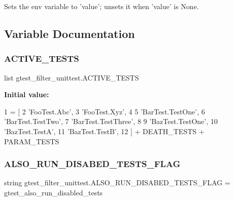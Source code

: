 \begin{DoxyVerb}Sets the env variable to 'value'; unsets it when 'value' is None.\end{DoxyVerb}
 

\subsection{Variable Documentation}
\mbox{\label{namespacegtest__filter__unittest_a8eb26cb0e0ac81737723cc9d16e1d253}} 
\subsubsection{\texorpdfstring{A\+C\+T\+I\+V\+E\+\_\+\+T\+E\+S\+TS}{ACTIVE\_TESTS}}
{\footnotesize\ttfamily list gtest\+\_\+filter\+\_\+unittest.\+A\+C\+T\+I\+V\+E\+\_\+\+T\+E\+S\+TS}

{\bfseries Initial value\+:}
\begin{DoxyCode}
1 =  [
2     \textcolor{stringliteral}{'FooTest.Abc'},
3     \textcolor{stringliteral}{'FooTest.Xyz'},
4 
5     \textcolor{stringliteral}{'BarTest.TestOne'},
6     \textcolor{stringliteral}{'BarTest.TestTwo'},
7     \textcolor{stringliteral}{'BarTest.TestThree'},
8 
9     \textcolor{stringliteral}{'BazTest.TestOne'},
10     \textcolor{stringliteral}{'BazTest.TestA'},
11     \textcolor{stringliteral}{'BazTest.TestB'},
12     ] + DEATH\_TESTS + PARAM\_TESTS
\end{DoxyCode}
\mbox{\label{namespacegtest__filter__unittest_aa2da713fbaa08fdbaa7cd78c45974edf}} 
\subsubsection{\texorpdfstring{A\+L\+S\+O\+\_\+\+R\+U\+N\+\_\+\+D\+I\+S\+A\+B\+E\+D\+\_\+\+T\+E\+S\+T\+S\+\_\+\+F\+L\+AG}{ALSO\_RUN\_DISABED\_TESTS\_FLAG}}
{\footnotesize\ttfamily string gtest\+\_\+filter\+\_\+unittest.\+A\+L\+S\+O\+\_\+\+R\+U\+N\+\_\+\+D\+I\+S\+A\+B\+E\+D\+\_\+\+T\+E\+S\+T\+S\+\_\+\+F\+L\+AG = \textquotesingle{}gtest\+\_\+also\+\_\+run\+\_\+disabled\+\_\+tests\textquotesingle{}}

